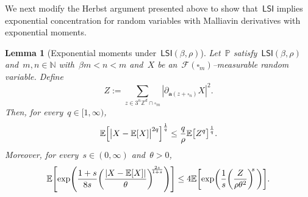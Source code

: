 \documentclass[11pt,twoside]{article} %
\let\oldsquare\square %
\renewcommand{\square}{\oldsquare}
\numberwithin{equation}{section}
\newtheorem{lemma}[theorem]{Lemma}
\theoremstyle{definition}
\let\originalleft\left
\let\originalright\right
\renewcommand{\left}{\mathopen{}\mathclose\bgroup\originalleft}
\renewcommand{\right}{\aftergroup\egroup\originalright}
\newcommand*{\N}{\ensuremath{\mathbb{N}}}
\newcommand*{\Zd}{\ensuremath{\mathbb{Z}^d}}
\renewcommand{\a}{\mathbf{a}}
\newcommand{\cu}{\square}
\newcommand{\F}{\mathcal{F}}
\renewcommand{\P}{\mathbb{P}}
\newcommand{\E}{\mathbb{E}}
\newcommand{\LSI}{\mathsf{LSI}}
\begin{document}
\smallskip 

We next modify the Herbst argument presented above to show that~$\LSI$ implies exponential concentration for random variables with Malliavin derivatives with exponential moments.

\begin{lemma}[Exponential moments under~$\LSI(\beta,\rho)$]
\label{l.LSI.moments}
Let~$\P$ satisfy~$\LSI(\beta,\rho)$ and~$m,n\in\N$ with~$\beta m < n < m$  and~$X$ be an~$\F(\cu_m)$--measurable random variable. Define
\begin{equation}
\label{e.Zderv.again}
Z := \sum_{z\in3^n\Zd\cap \cu_m} |  \partial_{\a(z+\cu_n)} X|^2.
\end{equation}
Then, for every~$q\in [1,\infty)$, 
\begin{align}
\label{e.LSI.momentbound}
\E \left[ \big| X - \E[X] \big|^{2q} \right]^{\frac1{q}}
\leq 
\frac{q}{\rho} \E \bigl[  Z^{q} \bigr]^{\frac1{q}}.
\end{align}
Moreover, for every~$s\in (0,\infty)$ and~$\theta>0$, 
\begin{align}
\label{e.LSI.expmoments}
\E \left[ \exp\left( \frac{1+s}{8s}\left( \frac{ \left| X - \E[X] \right|}{\theta} \right)^{\!\!\frac{2s}{1+s}} \right) \right]
\leq 
4
\E \left[ \exp\left( \frac1{s} \left( \frac{Z}{\rho\theta^2}  \right)^{\!\!s}\, \right) \right].
\end{align}
\end{lemma}
\end{document}
